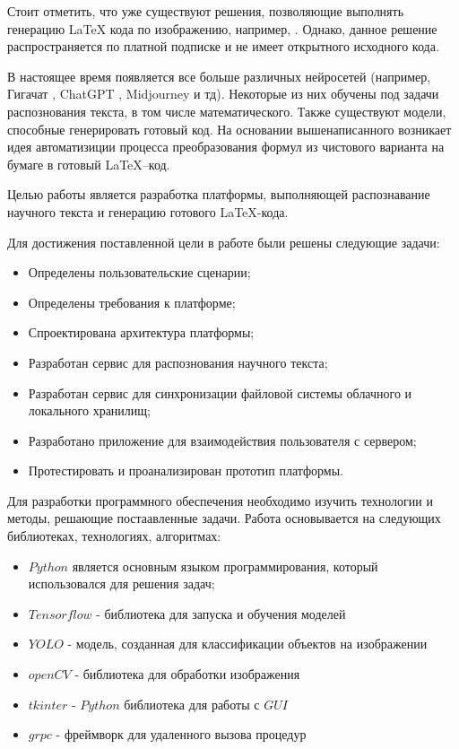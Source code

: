 Стоит отметить, что уже существуют решения, позволяющие выполнять генерацию \LaTeX\; кода по изображению, например, \cite{mathpix}. Однако, данное решение распространяется по платной подписке и не имеет открытного исходного кода.

В настоящее время появляется все больше различных нейросетей (например, Гигачат \cite{gigachat}, ChatGPT \cite{chat_gpt}, Midjourney \cite{midjourney} и тд). Некоторые из них обучены под задачи распознования текста, в том числе математического. Также существуют модели, способные генерировать готовый код. 
На основании вышенаписанного возникает идея автоматизиции процесса преобразования формул из чистового варианта на бумаге в готовый  \LaTeX --код.


Целью работы является разработка платформы, выполняющей распознавание научного текста и  генерацию готового \LaTeX-кода.

Для достижения поставленной цели в работе были решены следующие задачи:
\begin{itemize}
    \item Определены пользовательские сценарии;
    \item Определены требования к платформе;
    \item Спроектирована архитектура платформы;
    \item Разработан сервис для распознования научного текста;
    \item Разработан сервис для синхронизации файловой системы облачного и локального хранилищ;
    \item Разработано приложение для взаимодействия пользователя с сервером;
    \item Протестировать и проанализирован прототип платформы.
\end{itemize}

Для разработки программного обеспечения необходимо изучить технологии и методы, решающие постаавленные задачи. Работа основывается на следующих библиотеках, технологиях, алгоритмах:
\begin{itemize}
    \item $Python$ является основным языком программирования, который использовался для решения задач;
    \item $Tensorflow$ - библиотека для запуска и обучения моделей
    \item $YOLO$ - модель, созданная для классификации объектов на изображении
    \item $openCV$ - библиотека для обработки изображения
    \item $tkinter$ - $Python$ библиотека для работы с $GUI$
    \item $grpc$ - фреймворк для удаленного вызова процедур
\end{itemize}

